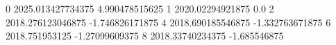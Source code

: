 0 2025.013427734375 4.990478515625
1 2020.02294921875 0.0
2 2018.276123046875 -1.746826171875
4 2018.690185546875 -1.332763671875
6 2018.751953125 -1.27099609375
8 2018.33740234375 -1.685546875
